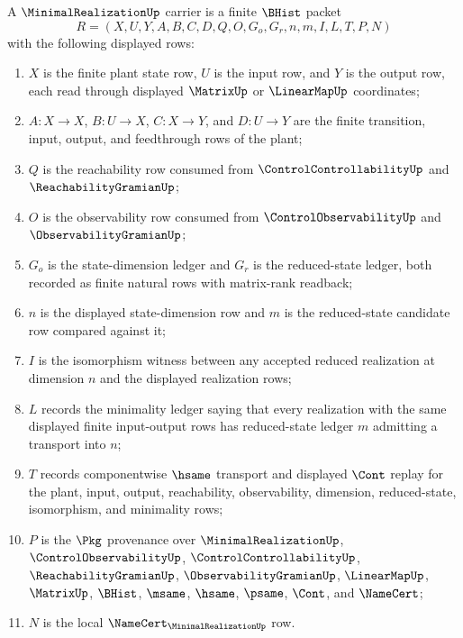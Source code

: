 \begin{definition}
\label{def:minimal-realization-carrier}
A $\MinimalRealizationUp$ carrier is a finite $\BHist$ packet
$$
R=(X,U,Y,A,B,C,D,Q,O,G_o,G_r,n,m,I,L,T,P,N)
$$
with the following displayed rows:
\begin{enumerate}
\item $X$ is the finite plant state row, $U$ is the input row, and $Y$ is the output row, each read through displayed $\MatrixUp$ or $\LinearMapUp$ coordinates;
\item $A:X\to X$, $B:U\to X$, $C:X\to Y$, and $D:U\to Y$ are the finite transition, input, output, and feedthrough rows of the plant;
\item $Q$ is the reachability row consumed from $\ControlControllabilityUp$ and $\ReachabilityGramianUp$;
\item $O$ is the observability row consumed from $\ControlObservabilityUp$ and $\ObservabilityGramianUp$;
\item $G_o$ is the state-dimension ledger and $G_r$ is the reduced-state ledger, both recorded as finite natural rows with matrix-rank readback;
\item $n$ is the displayed state-dimension row and $m$ is the reduced-state candidate row compared against it;
\item $I$ is the isomorphism witness between any accepted reduced realization at dimension $n$ and the displayed realization rows;
\item $L$ records the minimality ledger saying that every realization with the same displayed finite input-output rows has reduced-state ledger $m$ admitting a transport into $n$;
\item $T$ records componentwise $\hsame$ transport and displayed $\Cont$ replay for the plant, input, output, reachability, observability, dimension, reduced-state, isomorphism, and minimality rows;
\item $P$ is the $\Pkg$ provenance over $\MinimalRealizationUp$, $\ControlObservabilityUp$, $\ControlControllabilityUp$, $\ReachabilityGramianUp$, $\ObservabilityGramianUp$, $\LinearMapUp$, $\MatrixUp$, $\BHist$, $\msame$, $\hsame$, $\psame$, $\Cont$, and $\NameCert$;
\item $N$ is the local $\NameCert_{\MinimalRealizationUp}$ row.
\end{enumerate}
\end{definition}

